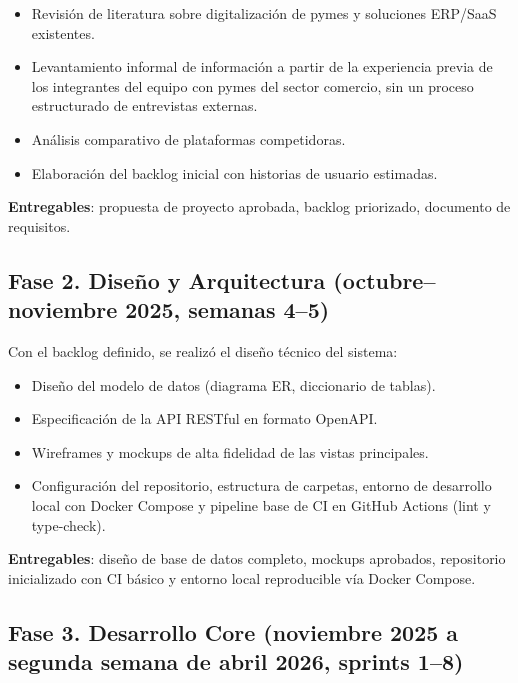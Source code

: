 \begin{itemize}
\tightlist
\item
  Revisión de literatura sobre digitalización de pymes y soluciones ERP/SaaS existentes.
\item
  Levantamiento informal de información a partir de la experiencia previa de los integrantes del equipo con pymes del sector comercio, sin un proceso estructurado de entrevistas externas.
\item
  Análisis comparativo de plataformas competidoras.
\item
  Elaboración del backlog inicial con historias de usuario estimadas.
\end{itemize}

\textbf{Entregables}: propuesta de proyecto aprobada, backlog priorizado, documento de requisitos.

\subsection{Fase 2. Diseño y Arquitectura (octubre--noviembre 2025, semanas 4--5)}\label{fase-2.-diseuxf1o-y-arquitectura-octubrenoviembre-2025-semanas-45}

Con el backlog definido, se realizó el diseño técnico del sistema:

\begin{itemize}
\tightlist
\item
  Diseño del modelo de datos (diagrama ER, diccionario de tablas).
\item
  Especificación de la API RESTful en formato OpenAPI.
\item
  Wireframes y mockups de alta fidelidad de las vistas principales.
\item
  Configuración del repositorio, estructura de carpetas, entorno de desarrollo local con Docker Compose y pipeline base de CI en GitHub Actions (lint y type-check).
\end{itemize}

\textbf{Entregables}: diseño de base de datos completo, mockups aprobados, repositorio inicializado con CI básico y entorno local reproducible vía Docker Compose.

\subsection{Fase 3. Desarrollo Core (noviembre 2025 a segunda semana de abril 2026, sprints 1--8)}\label{fase-3.-desarrollo-core-noviembre-2025-a-segunda-semana-de-abril-2026-sprints-18}

